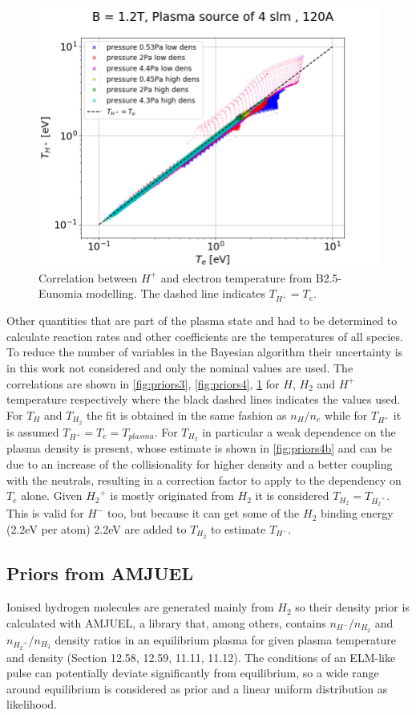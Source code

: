 \begin{figure}
	\centering
	\includegraphics[width=0.7\linewidth,trim={0 0 30 45},clip]{Chapters/chapter3/figs/THp_Te3.png}
	\caption{Correlation between $H^+$ and electron temperature from B2.5-Eunomia modelling. The dashed line indicates $T_{H^+}=T_e$.}
	\label{fig:priors5}
\end{figure}

Other quantities that are part of the plasma state and had to be determined to calculate reaction rates and other coefficients are the temperatures of all species. To reduce the number of variables in the Bayesian algorithm their uncertainty is in this work not considered and only the nominal values are used. The correlations are shown in \autoref{fig:priors3}, \ref{fig:priors4}, \ref{fig:priors5} for $H$, $H_2$ and $H^+$ temperature respectively where the black dashed lines indicates the values used. For $T_H$ and $T_{H_2}$ the fit is obtained in the same fashion as $n_H/n_e$ while for $T_{H^+}$ it is assumed $T_{H^+}=T_e=T_{plasma}$. For $T_{H_2}$ in particular a weak dependence on the plasma density is present, whose estimate is shown in \autoref{fig:priors4b} and can be due to an increase of the collisionality for higher density and a better coupling with the neutrals, resulting in a correction factor to apply to the dependency on $T_e$ alone. Given ${H_2}^+$ is mostly originated from $H_2$ it is considered $T_{H_2}=T_{{H_2}^+}$. This is valid for $H^-$ too, but because it can get some of the $H_2$ binding energy (2.2eV per atom) 2.2eV are added to $T_{H_2}$ to estimate $T_{H^-}$.\cite{Verhaegh2020}


\subsection{Priors from AMJUEL}\label{Priors from AMJUEL}
Ionised hydrogen molecules are generated mainly from $H_2$ so their density prior is calculated with AMJUEL\cite{Reiter2017}, a library that, among others, contains $n_{H^-}/n_{H_2}$ and $n_{{H_2}^+}/n_{H_2}$ density ratios in an equilibrium plasma for given plasma temperature and density (Section 12.58, 12.59, 11.11, 11.12). The conditions of an ELM-like pulse can potentially deviate significantly from equilibrium, so a wide range around equilibrium is considered as prior and a linear uniform distribution as likelihood.


